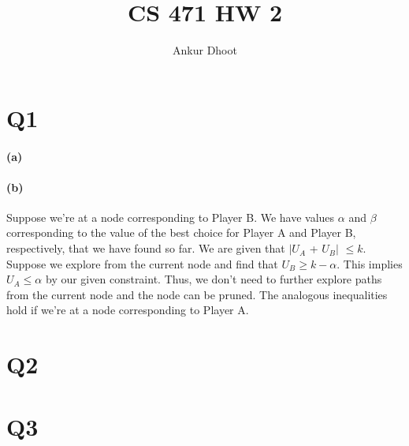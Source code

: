 \documentclass[11pt,a4paper]{article}
\begin{document}
\author{Ankur Dhoot}
\title{CS 471 HW 2}
\maketitle


\section*{Q1}

\paragraph*{(a)}
\begin{center}
\end{center}

\paragraph*{(b)}
Suppose we're at a node corresponding to Player B. We have values $\alpha$ and $\beta$ corresponding to the value of the best choice for Player A and Player B, respectively, that we have found so far. We are given that $|U_{A}$ + $U_{B}|$ $\leq k$. Suppose we explore from the current node and find that $U_{B} \geq k - \alpha$. This implies $U_{A} \leq \alpha$ by our given constraint. Thus, we don't need to further explore paths from the current node and the node can be pruned. The analogous inequalities hold if we're at a node corresponding to Player A.

\section*{Q2}


\section*{Q3}
\end{document}
